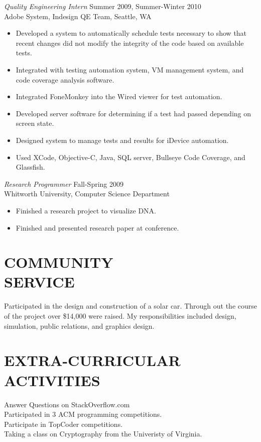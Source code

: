 \documentclass[line,margin]{res}
\begin{document}
\begin{resume}
				{\sl Quality Engineering Intern} \hfill Summer 2009, Summer-Winter 2010 \\
                Adobe System, Indesign QE Team, Seattle, WA
                 \begin{itemize}  \itemsep -2pt %
	                 \item Developed a system to automatically schedule tests necessary to show that recent changes did not modify the integrity of the code based on available tests.
	                \item Integrated with testing automation system, VM management system, and code coverage analysis software.
	                 \item Integrated FoneMonkey into the Wired viewer for test automation.
	                 \item Developed server software for determining if a test had passed depending on screen state.
	                 \item Designed system to manage tests and results for iDevice automation.
	                 \item Used XCode, Objective-C, Java, SQL server, Bullseye Code Coverage, and Glassfish.
 				 \end{itemize}
 								 
                {\sl Research Programmer} \hfill             Fall-Spring 2009 \\
                Whitworth University, Computer Science Department
                 \begin{itemize}  \itemsep -2pt %
	                 \item Finished a research project to visualize DNA.
	                 \item Finished and presented research paper at conference.
                 \end{itemize} 				
                 
                 


					
\section{COMMUNITY \\ SERVICE} Participated in the design and construction of a solar car. Through out the course of the project over \$14,000 were raised. My responsibilities included design, simulation, public relations, and graphics design.

\section{EXTRA-CURRICULAR \\ ACTIVITIES}
	Answer Questions on StackOverflow.com\\
	Participated in 3 ACM programming competitions.\\
	Participate in TopCoder competitions.\\
	Taking a class on Cryptography from the Univeristy of Virginia.
\end{resume}
\end{document}
